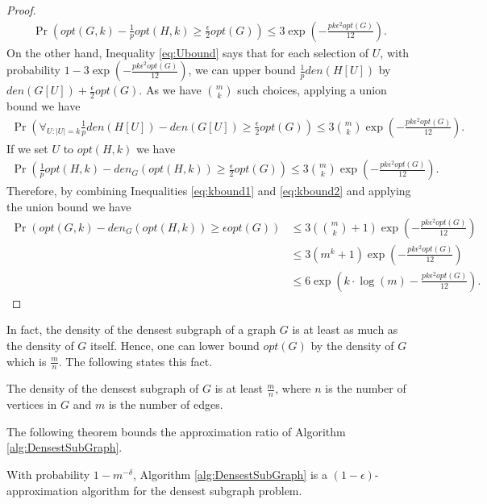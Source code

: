 \begin{proof}
	\begin{align}\label{eq:kbound1}
		\Pr\left(  opt(G,k) - \frac 1 p opt(H,k)  \geq \frac{\epsilon}{2}   opt(G)\right) \leq 3 \exp(-\frac{p k \epsilon^2  opt(G)} {12} ).
	\end{align}
	On the other hand, Inequality \ref{eq:Ubound} says that for each selection of $U$, with probability $1-3 \exp(-\frac{p k \epsilon^2  opt(G)} {12})$, we can upper bound $\frac 1 p den(H[U])$  by 
	$den(G[U]) + \frac{\epsilon}{2} opt(G)$. 
	As we have ${m \choose k}$ such choices, applying a union bound we have
\begin{align*}
		\Pr\left(\forall_{U:|U|=k}  \frac 1 p den(H[U]) - den(G[U])  \geq \frac{\epsilon}{2}   opt(G)\right) \leq 3{m \choose k} \exp(-\frac{p k \epsilon^2  opt(G)} {12} ).
	\end{align*}
	If we set $U$ to $opt(H,k)$ we have
	\begin{align}\label{eq:kbound2}
		\Pr\left(\frac 1 p opt(H,k) - den_G(opt(H,k))  \geq \frac{\epsilon}{2}   opt(G)\right) \leq 3{m \choose k} \exp(-\frac{p k \epsilon^2  opt(G)} {12} ).
	\end{align}
Therefore, by combining Inequalities \ref{eq:kbound1} and \ref{eq:kbound2} and applying the union bound we have
	\begin{align*}
		\Pr\left(   opt(G,k)- den_G(opt(H,k)) \geq \epsilon   opt(G)\right) &\leq 3({m \choose k}+1) \exp(-\frac{p k \epsilon^2  opt(G)} {12} )\\
		& \leq 3({m^k}+1) \exp(-\frac{p k \epsilon^2  opt(G)} {12} )\\
		& \leq 6 \exp(k\cdot \log(m) -\frac{p k \epsilon^2  opt(G)} {12} ).
	\end{align*}
\end{proof}




In fact, the density of the densest subgraph of a graph $G$ is at least as much as the density of $G$ itself. Hence, one can lower bound $opt(G)$ by the density of $G$ which is $\frac m n$. The following states this fact.

\begin{fact} \label{fc:boundOpt}
The density of the densest subgraph of $G$ is at least $\frac m n$, where $n$ is the number of vertices in $G$ and $m$ is the number of edges.
\end{fact}

The following theorem bounds the approximation ratio of Algorithm \ref{alg:DensestSubGraph}. 

\begin{theorem}\label{thm:mainDS}
With probability $1-m^{-\delta}$, Algorithm \ref{alg:DensestSubGraph} is a $(1-\epsilon)$-approximation algorithm for the densest subgraph problem.
\end{theorem}

